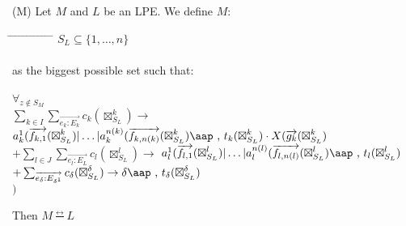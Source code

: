 \documentclass[a4paper,10pt]{article}
\theoremstyle{plain}
\theoremstyle{definition}
\newcommand{\ovr}{\overrightarrow}
\newcommand{\bisim}{\frac{\leftrightarrow}{}}
\newcommand{\tab}{\hspace*{5.mm} \= \hspace*{5.mm} \= \hspace*{5.mm} \= \hspace*{5.mm} \= \hspace*{5.mm} \= \hspace*{5.mm}  \= \hspace*{5.mm}  \= \hspace*{5.mm}  \= \hspace*{5.mm} \= \hspace*{5.mm} \= \hspace*{5.mm}  \= \hspace*{5.mm}  \= \hspace*{5.mm}\kill}
\newcommand{\at}[1]{\mbox{\aap ,} #1}
\begin{document}

\newcommand{\zi}{{\boxtimes}^k_{S_L}}
\newcommand{\zj}{{\boxtimes}^l_{S_L}}
\newcommand{\zd}{{\boxtimes}^\delta_{S_L}}


\begin{defn}(M) \label{def:lpe:M} Let $M$ and $L$ be an LPE. We define $M$:
\begin{tabbing}
\tab
$ S_L \subseteq \lbrace 1, \ldots, n \rbrace $ \\ \\
as the biggest possible set such that:\\ \\
$\forall_{z \not\in S_M}$\\
\>$\sum_{k \in I} \sum_{\ovr{e_k:E_k}} c_k ( \zi ) \rightarrow $
$ a_k^1 (\ovr{f_{k,1}}(\zi) \vert \ldots \vert a_k^{n(k)}(\ovr{f_{k,n(k)}}(\zi) \at \text{ } t_{k}(\zi)  \cdot X(\ovr{g_{k}}(\zi)
$ \\
\> $+ \sum_{l \in J} \sum_{\ovr{e_l:E_L}} c_l ( \zj ) \rightarrow $
$ a_{l}^1 (\ovr{f_{l,1}}(\zj) \vert \ldots \vert a_{l}^{n(l)}(\ovr{f_{l,n(l)}}(\zj) \at \text{ } t_{l}(\zj)
$ \\
\> $ + \sum_{\ovr{e_{\delta}:E_{\delta^1}}} c_{\delta} ( \zd ) \rightarrow 
{\delta} \at \text{ } t_{\delta}(\zd)$\\
$)$ \\
\end{tabbing}
\noindent Then $M \bisim L$
\end{defn}
\end{document}

